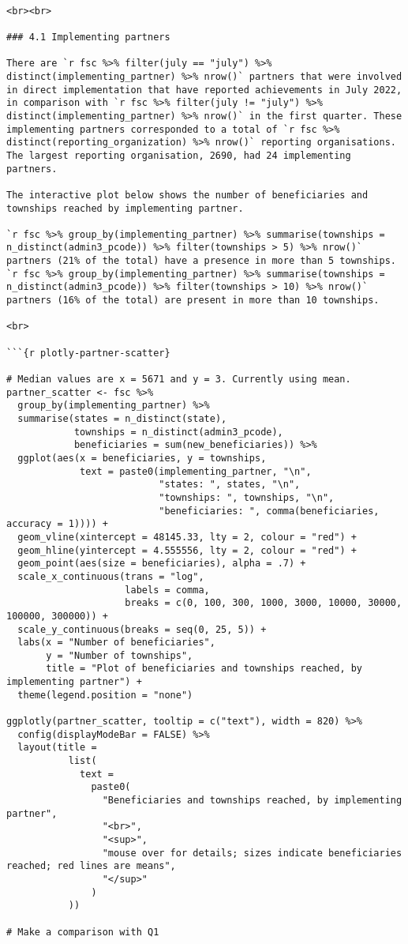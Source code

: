 \documentclass[
]{article}
\begin{document}
\begin{verbatim}

<br><br>

### 4.1 Implementing partners

There are `r fsc %>% filter(july == "july") %>% distinct(implementing_partner) %>% nrow()` partners that were involved in direct implementation that have reported achievements in July 2022, in comparison with `r fsc %>% filter(july != "july") %>% distinct(implementing_partner) %>% nrow()` in the first quarter. These implementing partners corresponded to a total of `r fsc %>%  distinct(reporting_organization) %>% nrow()` reporting organisations. The largest reporting organisation, 2690, had 24 implementing partners.

The interactive plot below shows the number of beneficiaries and townships reached by implementing partner.

`r fsc %>% group_by(implementing_partner) %>% summarise(townships = n_distinct(admin3_pcode)) %>% filter(townships > 5) %>% nrow()` partners (21% of the total) have a presence in more than 5 townships. `r fsc %>% group_by(implementing_partner) %>% summarise(townships = n_distinct(admin3_pcode)) %>% filter(townships > 10) %>% nrow()` partners (16% of the total) are present in more than 10 townships.

<br>

```{r plotly-partner-scatter}

# Median values are x = 5671 and y = 3. Currently using mean. 
partner_scatter <- fsc %>%  
  group_by(implementing_partner) %>% 
  summarise(states = n_distinct(state), 
            townships = n_distinct(admin3_pcode), 
            beneficiaries = sum(new_beneficiaries)) %>% 
  ggplot(aes(x = beneficiaries, y = townships, 
             text = paste0(implementing_partner, "\n", 
                           "states: ", states, "\n", 
                           "townships: ", townships, "\n", 
                           "beneficiaries: ", comma(beneficiaries, accuracy = 1)))) + 
  geom_vline(xintercept = 48145.33, lty = 2, colour = "red") + 
  geom_hline(yintercept = 4.555556, lty = 2, colour = "red") + 
  geom_point(aes(size = beneficiaries), alpha = .7) + 
  scale_x_continuous(trans = "log", 
                     labels = comma, 
                     breaks = c(0, 100, 300, 1000, 3000, 10000, 30000, 100000, 300000)) +
  scale_y_continuous(breaks = seq(0, 25, 5)) +
  labs(x = "Number of beneficiaries",
       y = "Number of townships",
       title = "Plot of beneficiaries and townships reached, by implementing partner") +
  theme(legend.position = "none")

ggplotly(partner_scatter, tooltip = c("text"), width = 820) %>%
  config(displayModeBar = FALSE) %>% 
  layout(title = 
           list(
             text =
               paste0(
                 "Beneficiaries and townships reached, by implementing partner",
                 "<br>",
                 "<sup>",
                 "mouse over for details; sizes indicate beneficiaries reached; red lines are means",
                 "</sup>"
               )
           ))

# Make a comparison with Q1
\end{verbatim}
\end{document}
